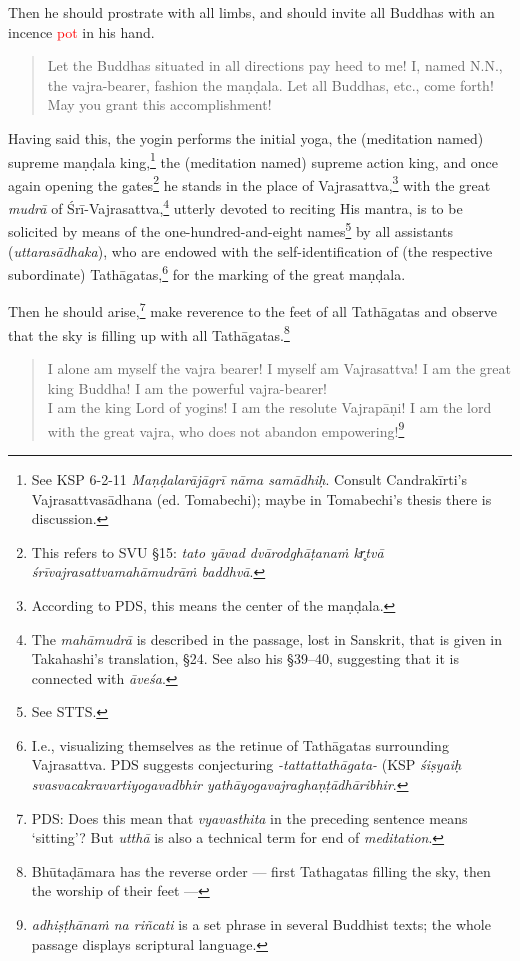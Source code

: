 \documentclass[11pt]{book}
\newcommand{\red}[1]{\textcolor{red}{#1}}
\newcommand{\skt}[1]{\emph{#1}}
\begin{document}
Then he should prostrate with all limbs, and should invite all Buddhas with an incence \red{pot} in his hand.
	
\begin{verse}
	Let the Buddhas situated in all directions pay heed to me! I, named N.N., the vajra-bearer, fashion the maṇḍala. Let all Buddhas, etc., come forth! May you grant this accomplishment!
\end{verse}

\noindent Having said this, the yogin performs the initial yoga, the (meditation named) supreme maṇḍala king,\footnote{See KSP 6-2-11 \textit{Maṇḍalarājāgrī nāma samādhiḥ}. Consult Candrakīrti's Vajrasattvasādhana (ed. Tomabechi); maybe in Tomabechi's thesis there is discussion.} the (meditation named) supreme action king, and once again opening the gates\footnote{This refers to SVU §15: \skt{tato yāvad dvārodghāṭanaṁ kr̥tvā śrīvajrasattvamahāmudrāṁ baddhvā}.} he stands in the place of Vajrasattva,\footnote{According to PDS, this means the center of the maṇḍala.} with the great \skt{mudrā} of Śrī-Vajrasattva,\footnote{The \skt{mahāmudrā} is described in the passage, lost in Sanskrit, that is given in Takahashi's translation, §24. See also his §39–40, suggesting that it is connected with \skt{āveśa}.} utterly devoted to reciting His mantra, is to be solicited by means of the one-hundred-and-eight names\footnote{See STTS.} by all assistants (\skt{uttarasādhaka}), who are endowed with the self-identification of (the respective subordinate) Tathāgatas,\footnote{I.e., visualizing themselves as the retinue of Tathāgatas surrounding Vajrasattva. PDS suggests conjecturing \skt{-tattattathāgata-} (KSP \skt{śiṣyaiḥ svasvacakravartiyogavadbhir yathāyogavajraghaṇṭādhāribhir}.} for the marking of the great maṇḍala.

Then he should arise,\footnote{PDS: Does this mean that \skt{vyavasthita} in the preceding sentence means `sitting'? But \skt{utthā} is also a technical term for end of \skt{meditation}.} make reverence to the feet of all Tathāgatas and observe that the sky is filling up with all Tathāgatas.\footnote{Bhūtaḍāmara has the reverse order — first Tathagatas filling the sky, then the worship of their feet —}

\begin{verse}
	I alone am myself the vajra bearer! I myself am Vajrasattva! I am the great king Buddha! I am the powerful vajra-bearer!\\
	I am the king Lord of yogins! I am the resolute Vajrapāṇi! I am the lord with the great vajra, who does not abandon empowering!\footnote{\skt{adhiṣṭhānaṁ na riñcati} is a set phrase in several Buddhist texts; the whole passage displays scriptural language.}
\end{verse}
\end{document}
